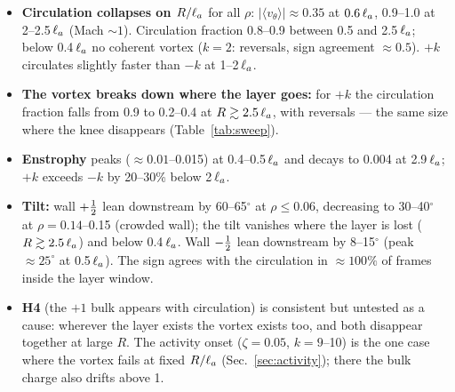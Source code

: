 \begin{itemize}
  \item \textbf{Circulation collapses on $R/\ell_a$} for all $\rho$: $|\langle v_\theta\rangle|\approx0.35$ at $0.6\,\ell_a$, 0.9--1.0
        at 2--2.5\,$\ell_a$ (Mach $\sim1$). Circulation fraction 0.8--0.9 between 0.5 and 2.5\,$\ell_a$; below 0.4\,$\ell_a$ no coherent vortex
        ($k=2$: reversals, sign agreement $\approx0.5$). $+k$ circulates slightly faster than $-k$ at 1--2\,$\ell_a$.
  \item \textbf{The vortex breaks down where the layer goes:} for $+k$ the circulation fraction falls from 0.9 to 0.2--0.4 at
        $R\gtrsim2.5\,\ell_a$, with reversals --- the same size where the knee disappears (Table~\ref{tab:sweep}).
  \item \textbf{Enstrophy} peaks ($\approx0.01$--0.015) at 0.4--0.5\,$\ell_a$ and decays to 0.004 at 2.9\,$\ell_a$; $+k$ exceeds $-k$ by
        20--30\% below 2\,$\ell_a$.
  \item \textbf{Tilt:} wall $+\tfrac12$ lean downstream by 60--65$^\circ$ at $\rho\le0.06$, decreasing to 30--40$^\circ$ at
        $\rho=0.14$--0.15 (crowded wall); the tilt vanishes where the layer is lost ($R\gtrsim2.5\,\ell_a$) and below 0.4\,$\ell_a$. Wall
        $-\tfrac12$ lean downstream by 8--15$^\circ$ (peak $\approx25^\circ$ at 0.5\,$\ell_a$). The sign agrees with the circulation in
        $\approx100\%$ of frames inside the layer window.
  \item \textbf{H4} (the $+1$ bulk appears with circulation) is consistent but untested as a cause: wherever the layer exists the
        vortex exists too, and both disappear together at large $R$. The activity onset ($\zeta=0.05$, $k=9$--10) is the one case
        where the vortex fails at fixed $R/\ell_a$ (Sec.~\ref{sec:activity}); there the bulk charge also drifts above 1.
\end{itemize}
